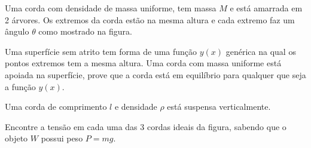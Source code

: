 \documentclass[]{IMTexam}
\author{Isabella B.}
\date{}
\begin{document}
\maketitle

\begin{questions}

	\question Uma corda com densidade de massa uniforme, tem massa $ M $ e está amarrada em 2 árvores. Os extremos da corda estão na mesma altura e cada extremo faz um ângulo $\theta$ como mostrado na figura.

	\question Uma superfície sem atrito tem forma de uma função $ y(x) $ genérica na qual os pontos extremos tem a mesma altura. Uma corda com massa uniforme está apoiada na superfície, prove que a corda está em equilíbrio para qualquer que seja a função $ y(x) $.

	\question Uma corda de comprimento $ l $ e densidade $\rho$ está suspensa verticalmente.


	\question Encontre a tensão em cada uma das 3 cordas ideais da figura, sabendo que o objeto $ W $ possui peso $ P = mg $.

	\begin{solution}

	\end{solution}


\end{questions}
\end{document}

